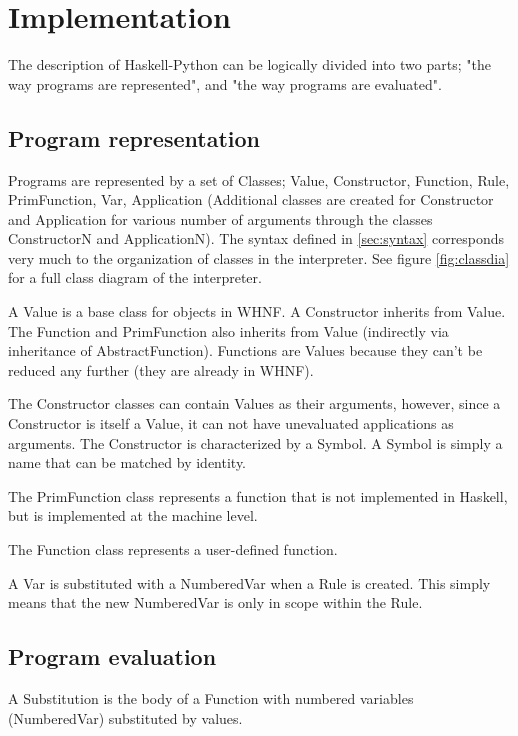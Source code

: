 \section{Implementation}

The description of Haskell-Python can be 
logically divided into two parts; "the way programs are 
represented", and "the way programs are evaluated".

\subsection{Program representation}

Programs are represented by a set of Classes; Value, Constructor, Function, Rule, 
PrimFunction, Var, Application (Additional classes are created for Constructor
and Application for various number of arguments through the classes ConstructorN 
and ApplicationN). The syntax defined in \ref{sec:syntax} corresponds very much
to the organization of classes in the interpreter. See figure \ref{fig:classdia} 
for a full class diagram of the interpreter.

A Value is a base class for objects in WHNF. A Constructor inherits from Value.
The Function and PrimFunction also inherits from Value (indirectly 
via inheritance of AbstractFunction). Functions are Values because they can't 
be reduced any further (they are already in WHNF).

The Constructor classes can contain Values as their arguments, however, since
a Constructor is itself a Value, it can not have unevaluated applications as
arguments. The Constructor is characterized by a Symbol. A Symbol is simply
a name that can be matched by identity.

The PrimFunction class represents a function that is not implemented in 
Haskell, but is implemented at the machine level.

The Function class represents a user-defined function.

A Var is substituted with a NumberedVar when a Rule is created. This simply
means that the new NumberedVar is only in scope within the Rule.

\subsection{Program evaluation}

A Substitution is the body of a Function with numbered variables 
(NumberedVar) substituted by values.

